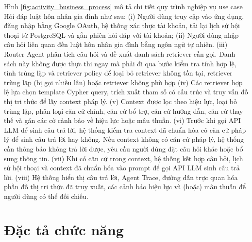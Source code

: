 \documentclass[../DoAn.tex]{subfiles}
\begin{document}
Hình \ref{fig:activity_business_process} mô tả chi tiết quy trình nghiệp vụ use case Hỏi đáp luật hôn nhân gia đình như sau: (i) Người dùng truy cập vào ứng dụng, đăng nhập bằng Google OAuth, hệ thống xác thực tài khoản, tải lại lịch sử hội thoại từ PostgreSQL và gắn phiên hỏi đáp với tài khoản; (ii) Người dùng nhập câu hỏi liên quan đến luật hôn nhân gia đình bằng ngôn ngữ tự nhiên. (iii) Router Agent phân tích câu hỏi và đề xuất danh sách retriever cần gọi. Danh sách này không được thực thi ngay mà phải đi qua bước kiểm tra tính hợp lệ, tính trùng lặp và retriever policy để loại bỏ retriever không tồn tại, retriever trùng lặp (bị gọi nhiều lần) hoặc retriever không phù hợp (iv) Các retriever hợp lệ lựa chọn template Cypher query, trích xuất tham số có cấu trúc và truy vấn đồ thị tri thức để lấy context pháp lý. (v) Context được lọc theo hiệu lực, loại bỏ trùng lặp, phân loại căn cứ chính, căn cứ bổ trợ, căn cứ hướng dẫn, căn cứ thay thế và gán các cờ cảnh báo về hiệu lực hoặc mâu thuẫn. (vi) Trước khi gọi API LLM để sinh câu trả lời, hệ thống kiểm tra context đã chuẩn hóa có căn cứ pháp lý để sinh câu trả lời hay không. Nếu context không có căn cứ pháp lý, hệ thống cần thông báo không trả lời được, yêu cầu người dùng đặt câu hỏi khác hoặc bổ sung thông tin. (vii) Khi có căn cứ trong context, hệ thống kết hợp câu hỏi, lịch sử hội thoại và context đã chuẩn hóa vào prompt để gọi API LLM sinh câu trả lời. (viii) Hệ thống hiển thị câu trả lời, Agent Trace, đường dẫn trực quan hóa phần đồ thị tri thức đã truy xuất, các cảnh báo hiệu lực và (hoặc) mâu thuẫn để người dùng có thể đối chiếu.


\section{Đặc tả chức năng}
\end{document}
